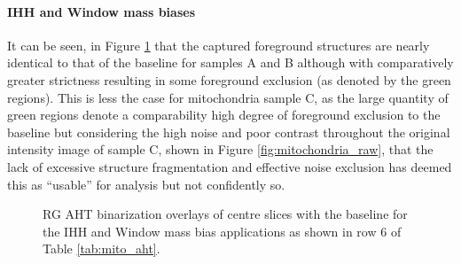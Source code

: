 \paragraph{IHH and Window mass biases}
It can be seen, in Figure \ref{fig:mito_aht_bias_plus_mass} that the captured foreground structures are nearly identical to that of the baseline for samples A and B although with comparatively greater strictness resulting in some foreground exclusion (as denoted by the green regions). This is less the case for mitochondria sample C, as the large quantity of green regions denote a comparability high degree of foreground exclusion to the baseline but considering the high noise and poor contrast throughout the original intensity image of sample C, shown in Figure \ref{fig:mitochondria_raw}, that the lack of excessive structure fragmentation and effective noise exclusion has deemed this as ``usable'' for analysis but not confidently so.

\begin{figure}[ht!]
	\centering
	\caption[RG AHT binarization overlays of centre slices with the baseline for only the IHH bias applied]{RG AHT binarization overlays of centre slices with the baseline for the IHH and Window mass bias applications as shown in row $6$ of Table \ref{tab:mito_aht}.}
	\label{fig:mito_aht_bias_plus_mass}
\end{figure}

